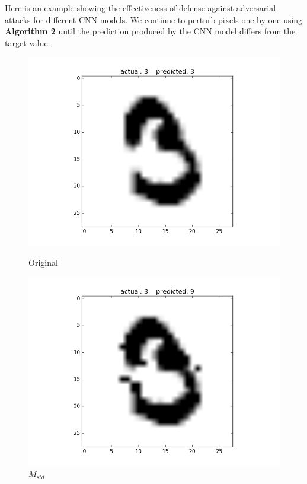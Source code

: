 \documentclass{article}
\begin{document}
Here is an example showing the effectiveness of defense against adversarial attacks for different CNN models.
We continue to perturb pixels one by one using \textbf{Algorithm 2} until the prediction produced by the CNN model differs from the target value.

\begin{figure}[h!]
	\begin{minipage}{0.5\textwidth}
		\centering
		\includegraphics[width=\textwidth]{original1.png}
		\caption{Original}
	\end{minipage} \hfill
	\begin{minipage}{0.5\textwidth}
		\centering
		\includegraphics[width=\textwidth]{std1.png}
		\caption{$M_{std}$}
	\end{minipage} 
\end{figure}
\end{document}
